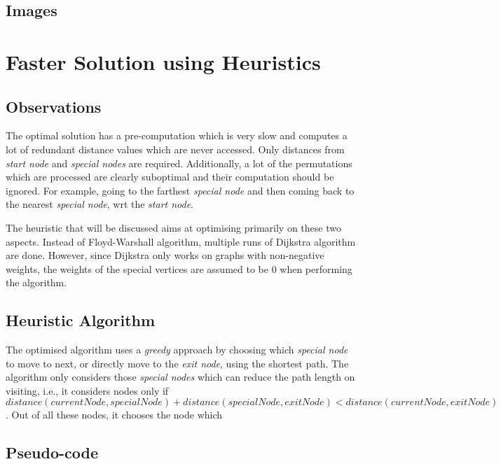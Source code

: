 \documentclass[12pt]{report}
\begin{document}
\section{Images} %

\chapter{Faster Solution using Heuristics}

\section{Observations}
The optimal solution has a pre-computation which is very slow and computes a lot of redundant distance values which are never accessed. Only distances from \textit{start node} and \textit{special nodes} are required. Additionally, a lot of the permutations which are processed are clearly suboptimal and their computation should be ignored. For example, going to the farthest \textit{special node} and then coming back to the nearest \textit{special node}, wrt the \textit{start node}.\par
The heuristic that will be discussed aims at optimising primarily on these two aspects. Instead of Floyd-Warshall algorithm, multiple runs of Dijkstra algorithm are done. However, since Dijkstra only works on graphs with non-negative weights, the weights of the special vertices are assumed to be $0$ when performing the algorithm.

\section{Heuristic Algorithm} %
The optimised algorithm uses a \textit{greedy} approach by choosing which \textit{special node} to move to next, or directly move to the \textit{exit node}, using the shortest path. The algorithm only considers those \textit{special nodes} which can reduce the path length on visiting, i.e., it considers nodes only if ${distance}({currentNode}, {specialNode}) + {distance}({specialNode}, {exitNode}) < {distance}({currentNode}, {exitNode})$. Out of all these nodes, it chooses the node which %

\section{Pseudo-code}
\end{document}
